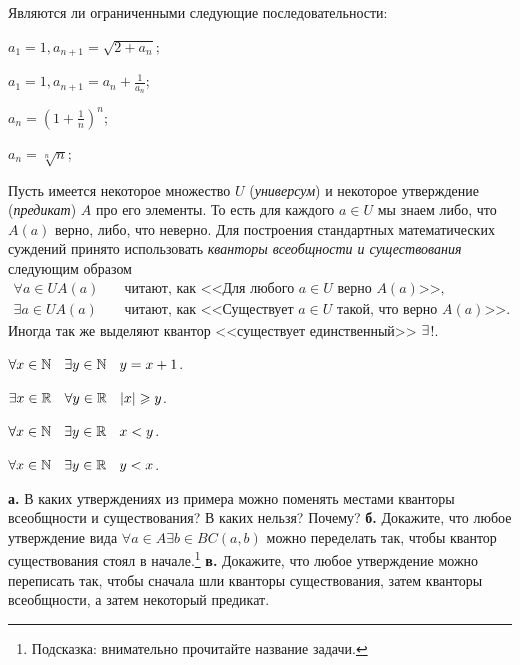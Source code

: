 \documentclass[a4paper, 12pt, num=24]{listok}
\begin{document}
\begin{problem}
	Являются ли ограниченными следующие последовательности:
	\begin{multienum}{3}
		\item $a_1 = 1, a_{n + 1} = \sqrt{2 + a_n}$;
		\item $a_1 = 1, a_{n + 1} = a_n + \frac1{a_n}$;
		\item $a_n = {(1 + \frac1n)}^n$;
		\item $a_n = \sqrt[n]n$;
	\end{multienum}
\end{problem}
\begin{definition}
	Пусть имеется некоторое множество $U$ (\textit{универсум})
	и некоторое утверждение (\textit{предикат}) $A$ про его элементы.
	То есть для каждого $a \in U$ мы знаем либо, что $A(a)$ верно, либо, что неверно.
	Для построения стандартных математических суждений принято использовать \textit{кванторы всеобщности и существования} следующим образом
	\begin{align*}
		\forall{a \in U} A(a) &\quad\text{читают, как <<Для любого $a \in U$ верно $A(a)$>>},\\
		\exists{a \in U} A(a) &\quad\text{читают, как <<Существует $a \in U$ такой, что верно $A(a)$>>}.
	\end{align*}
	Иногда так же выделяют квантор <<существует единственный>> $\existssym$!.
\end{definition}
\begin{example}
	\phantom{000}
	\begin{multienum}{2}
		\item $\forall{x \in \N} \exists{y \in \N} y = x + 1$.
		\item $\exists{x \in \R} \forall{y \in \R} |x| \ge y$.
		\item $\forall{x \in \N} \exists{y \in \R} x < y$.
		\item $\forall{x \in \N} \exists{y \in \R} y < x$.
	\end{multienum}
\end{example}
\begin{problem}
	\textbf{а.} В каких утверждениях из примера можно поменять местами кванторы всеобщности и существования?
	В каких нельзя? Почему?
	\textbf{б.} Докажите, что любое утверждение вида $\forall{a \in A} \exists{b \in B} C(a, b)$ можно переделать так,
	чтобы квантор существования стоял в начале.\footnote{Подсказка: внимательно прочитайте название задачи.}
	\textbf{в.} Докажите, что любое утверждение можно переписать так, чтобы сначала шли кванторы существования, затем кванторы всеобщности, а затем некоторый предикат.
\end{problem}
\end{document}
